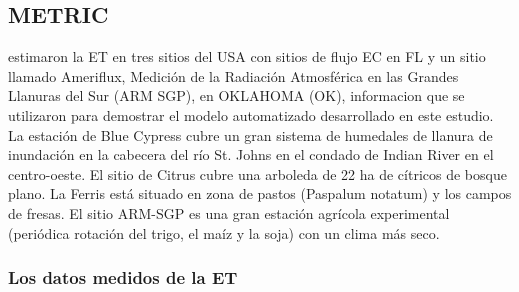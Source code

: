 \lipsum[2]

\subsection{METRIC}

\lipsum[1]

\lipsum[2]

\parencite{Bhattarai2017} estimaron la ET en tres sitios del USA con sitios de flujo EC en FL y un sitio llamado Ameriflux, Medición de la Radiación Atmosférica en las Grandes Llanuras del Sur (ARM SGP), en OKLAHOMA (OK), informacion que se utilizaron para demostrar el modelo automatizado desarrollado en este estudio.  La estación de Blue Cypress cubre un gran sistema de humedales de llanura de inundación en la cabecera del río St. Johns en el condado de Indian River en el centro-oeste. El sitio de Citrus cubre una arboleda de 22 ha de cítricos de bosque plano. La Ferris está situado en zona de pastos (Paspalum notatum) y los campos de fresas. El sitio ARM-SGP es una gran estación agrícola experimental (periódica rotación del trigo, el maíz y la soja) con un clima más seco.

\subsubsection{Los datos medidos de la ET}

\lipsum[4]

